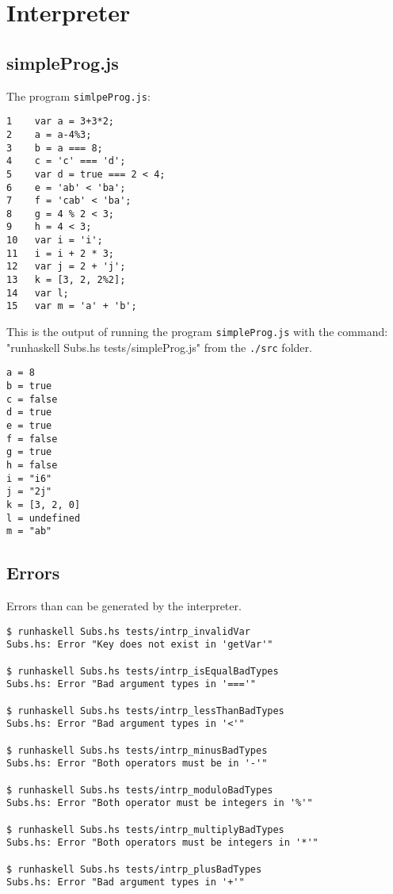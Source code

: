 \documentclass[a4paper]{article}
\begin{document}
\newpage
\section{Interpreter}

\subsection{simpleProg.js}
\label{B1}
The program \texttt{simlpeProg.js}:
\begin{verbatim}
1    var a = 3+3*2;
2    a = a-4%3;
3    b = a === 8;
4    c = 'c' === 'd';
5    var d = true === 2 < 4;
6    e = 'ab' < 'ba';
7    f = 'cab' < 'ba';
8    g = 4 % 2 < 3;
9    h = 4 < 3;
10   var i = 'i';
11   i = i + 2 * 3;
12   var j = 2 + 'j';
13   k = [3, 2, 2%2];
14   var l;
15   var m = 'a' + 'b';
\end{verbatim}
This is the output of running the program \texttt{simpleProg.js} with the command: \\
"runhaskell Subs.hs tests/simpleProg.js" from the \texttt{./src} folder.
\begin{verbatim}
a = 8
b = true
c = false
d = true
e = true
f = false
g = true
h = false
i = "i6"
j = "2j"
k = [3, 2, 0]
l = undefined
m = "ab"
\end{verbatim}

\subsection{Errors}
\label{B2}
Errors than can be generated by the interpreter.
\begin{verbatim}
$ runhaskell Subs.hs tests/intrp_invalidVar
Subs.hs: Error "Key does not exist in 'getVar'"

$ runhaskell Subs.hs tests/intrp_isEqualBadTypes
Subs.hs: Error "Bad argument types in '==='"

$ runhaskell Subs.hs tests/intrp_lessThanBadTypes
Subs.hs: Error "Bad argument types in '<'"

$ runhaskell Subs.hs tests/intrp_minusBadTypes
Subs.hs: Error "Both operators must be in '-'"

$ runhaskell Subs.hs tests/intrp_moduloBadTypes
Subs.hs: Error "Both operator must be integers in '%'"

$ runhaskell Subs.hs tests/intrp_multiplyBadTypes
Subs.hs: Error "Both operators must be integers in '*'"

$ runhaskell Subs.hs tests/intrp_plusBadTypes
Subs.hs: Error "Bad argument types in '+'"
\end{verbatim}
\end{document}
